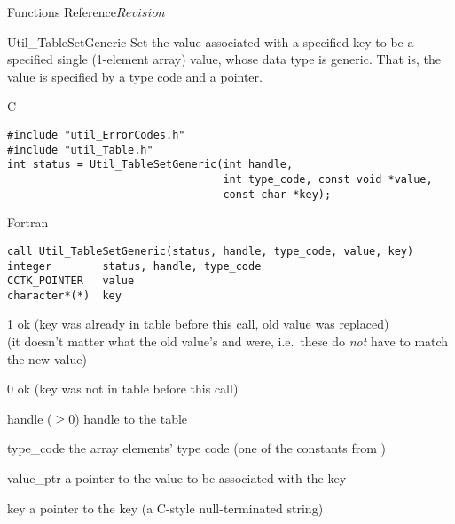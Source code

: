 \begin{cactuspart}{ Functions Reference}{}{$Revision$}
\begin{FunctionDescription}{Util\_TableSetGeneric}
\label{Util-TableSetGeneric}
Set the value associated with a specified key to be a specified
single (1-element array) value, whose data type is generic.  That
is, the value is specified by a  type code
and a  pointer.

\begin{SynopsisSection}
\begin{Synopsis}{C}
\begin{verbatim}
#include "util_ErrorCodes.h"
#include "util_Table.h"
int status = Util_TableSetGeneric(int handle,
                                  int type_code, const void *value,
                                  const char *key);
\end{verbatim}
\end{Synopsis}
\begin{Synopsis}{Fortran}
\begin{verbatim}
call Util_TableSetGeneric(status, handle, type_code, value, key)
integer        status, handle, type_code
CCTK_POINTER   value
character*(*)  key
\end{verbatim}
\end{Synopsis}
\end{SynopsisSection}

\begin{ResultSection}
\begin{Result}{\rm 1}
ok (key was already in table before this call, old value was replaced)\\
   (it doesn't matter what the old value's  and
     were, i.e.\ these do {\em not\/} have to match
    the new value)
\end{Result}
\begin{Result}{\rm 0}
ok (key was not in table before this call)
\end{Result}
\end{ResultSection}

\begin{ParameterSection}
\begin{Parameter}{handle ($\ge 0$)}
handle to the table
\end{Parameter}
\begin{Parameter}{type\_code}
the array elements' type code
(one of the  constants from )
\end{Parameter}
\begin{Parameter}{value\_ptr}
a pointer to the value to be associated with the key
\end{Parameter}
\begin{Parameter}{key}
a pointer to the key (a C-style null-terminated string)
\end{Parameter}
\end{ParameterSection}


\end{FunctionDescription}
\end{cactuspart}
